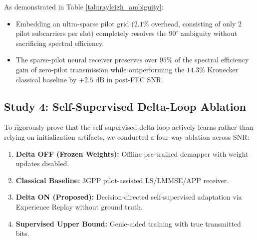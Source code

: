 \documentclass[journal]{IEEEtran}
\begin{document}
As demonstrated in Table \ref{tab:rayleigh_ambiguity}:
\begin{itemize}
    \item Embedding an ultra-sparse pilot grid ($2.1\%$ overhead, consisting of only 2 pilot subcarriers per slot) completely resolves the $90^\circ$ ambiguity without sacrificing spectral efficiency.
    \item The sparse-pilot neural receiver preserves over $95\%$ of the spectral efficiency gain of zero-pilot transmission while outperforming the $14.3\%$ Kronecker classical baseline by $+2.5\text{ dB}$ in post-FEC SNR.
\end{itemize}

\subsection{Study 4: Self-Supervised Delta-Loop Ablation}
To rigorously prove that the self-supervised delta loop actively learns rather than relying on initialization artifacts, we conducted a four-way ablation across SNR:
\begin{enumerate}
    \item \textbf{Delta OFF (Frozen Weights):} Offline pre-trained demapper with weight updates disabled.
    \item \textbf{Classical Baseline:} 3GPP pilot-assisted LS/LMMSE/APP receiver.
    \item \textbf{Delta ON (Proposed):} Decision-directed self-supervised adaptation via Experience Replay without ground truth.
    \item \textbf{Supervised Upper Bound:} Genie-aided training with true transmitted bits.
\end{enumerate}

\begin{table}[!t]
\caption{Delta-Loop Ablation Study Across $E_b/N_0$ ($k=1,792$ bits)}
\label{tab:delta_ablation}
\centering
{}
\end{table}
\end{document}
